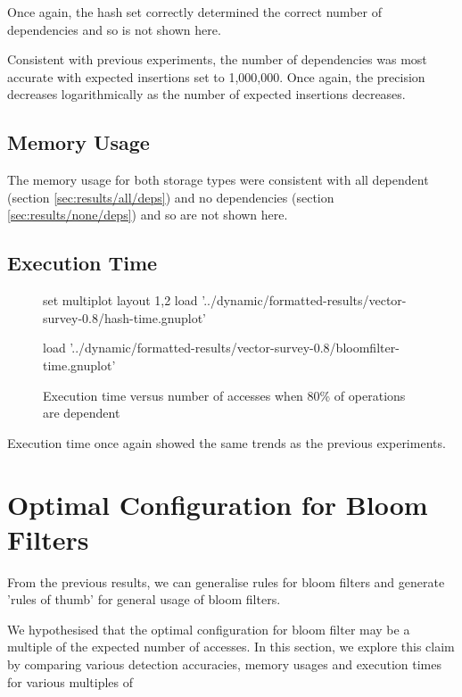 	Once again, the hash set correctly determined the correct number of dependencies and so is not shown here.
		
	Consistent with previous experiments, the number of dependencies was most accurate with expected insertions set to 1,000,000. Once again, the precision decreases logarithmically as the number of expected insertions decreases.
	
	\subsection{Memory Usage} \label{sec:results/80/mem}
	The memory usage for both storage types were consistent with all dependent (section \ref{sec:results/all/deps}) and no dependencies (section \ref{sec:results/none/deps}) and so are not shown here.
	
	\subsection{Execution Time} \label{sec:results/80/time}
	\begin{figure}
		\centering
		\begin{gnuplot}[terminal=pdf]
			set multiplot layout 1,2
				load '../dynamic/formatted-results/vector-survey-0.8/hash-time.gnuplot'
				
				load '../dynamic/formatted-results/vector-survey-0.8/bloomfilter-time.gnuplot'
		\end{gnuplot}
		\caption{Execution time versus number of accesses when 80\% of operations are dependent}
		\label{chart:80-time}
	\end{figure}
	
	Execution time once again showed the same trends as the previous experiments.

\section{Optimal Configuration for Bloom Filters} \label{sec:results/opt-conf}
From the previous results, we can generalise rules for bloom filters and generate 'rules of thumb' for general usage of bloom filters.

We hypothesised that the optimal configuration for bloom filter may be a multiple of the expected number of accesses. In this section, we explore this claim by comparing various detection accuracies, memory usages and execution times for various multiples of 